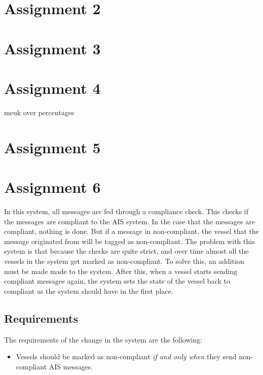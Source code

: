 \documentclass[12pt]{article}
\begin{document}
\section*{Assignment 2}

\section*{Assignment 3}

\section*{Assignment 4}
meuk over percentages

\section*{Assignment 5}

\section*{Assignment 6}
In this system, all messages are fed through a compliance check. This checks if the messages are compliant to the AIS system. In the case that the messages are compliant, nothing is done. But if a message in non-compliant, the vessel that the message originated from will be tagged as non-compliant. The problem with this system is that because the checks are quite strict, and over time almost all the vessels in the system get marked as non-compliant. To solve this, an addition must be made made to the system. After this, when a vessel starts sending compliant messages again, the system sets the state of the vessel back to compliant as the system should have in the first place.

\subsection*{Requirements}
The requirements of the change in the system are the following:
\begin{itemize}
\item Vessels should be marked as non-compliant \emph{if and only when} they send non-compliant AIS messages.
\end{itemize}
\end{document}

